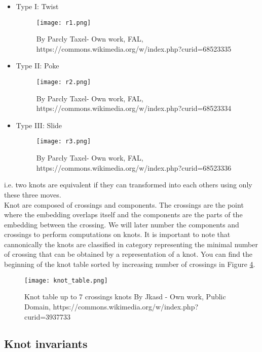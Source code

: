 \documentclass[12pt, a4paper]{article}
\begin{document}
\begin{itemize}
    \item Type I: Twist
\begin{figure}[H]
             \centering
            \texttt{[image: r1.png]}
          \caption{By Parcly Taxel- Own work, FAL, https://commons.wikimedia.org/w/index.php?curid=68523335}
        \label{fig:r_1}
\end{figure}
    \item Type II: Poke
\begin{figure}[H]
             \centering
            \texttt{[image: r2.png]}
          \caption{By Parcly Taxel- Own work, FAL, https://commons.wikimedia.org/w/index.php?curid=68523334}
        \label{fig:r_2}
\end{figure}
    \item Type III: Slide 
\begin{figure}[H]
             \centering
            \texttt{[image: r3.png]}
          \caption{By Parcly Taxel- Own work, FAL, https://commons.wikimedia.org/w/index.php?curid=68523336}
        \label{fig:r_3}
\end{figure}
  \end{itemize}

i.e. two knots are equivalent if they can transformed into each others using only these three moves.\\

Knot are composed of crossings and components. The crossings are the point where the embedding overlaps itself and the components are the parts of the embedding between the crossing. We will later number the components and crossings to perform computations on knots. It is important to note that cannonically the knots are classified in category representing the minimal number of crossing that can be obtained by a representation of a knot. You can find the beginning of the knot table sorted by increasing number of crossings in Figure \ref{fig:knot_table}.

\begin{figure}[H]
  \centering
  \texttt{[image: knot\_table.png]}
  \caption{Knot table up to 7 crossings knots By Jkasd - Own work, Public Domain, https://commons.wikimedia.org/w/index.php?curid=3937733}
  \label{fig:knot_table}
\end{figure}

\subsection{Knot invariants}
\end{document}
